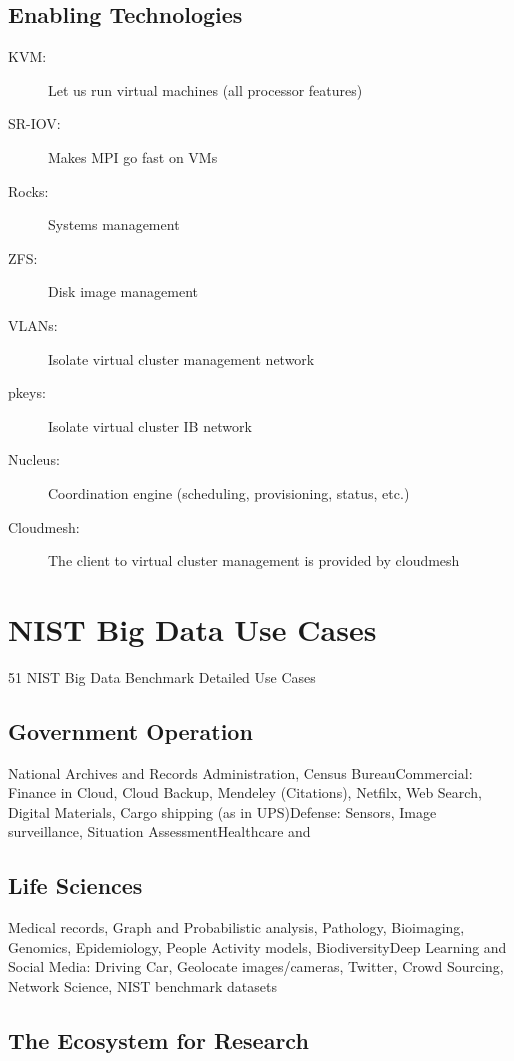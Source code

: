 \subsection{Enabling Technologies}
\begin{description}
\item[KVM:] Let us run virtual machines (all processor features)
\item[SR-IOV:] Makes MPI go fast on VMs
\item[Rocks:] Systems management
\item[ZFS:] Disk image management
\item[VLANs:] Isolate virtual cluster management network
\item[pkeys:] Isolate virtual cluster IB network
\item[Nucleus:] Coordination engine (scheduling, provisioning, status,
  etc.)
\item[Cloudmesh:] The client to virtual cluster management is
  provided by cloudmesh 
\end{description}


\section{NIST Big Data Use Cases}

51 NIST Big Data Benchmark Detailed Use Cases

\subsection{Government Operation} 

National Archives and Records Administration, Census BureauCommercial:
Finance in Cloud, Cloud Backup, Mendeley (Citations), Netfilx, Web
Search, Digital Materials, Cargo shipping (as in UPS)Defense: Sensors,
Image surveillance, Situation AssessmentHealthcare and

\subsection{Life Sciences} 

Medical records, Graph and Probabilistic analysis, Pathology,
Bioimaging, Genomics, Epidemiology, People Activity models,
BiodiversityDeep Learning and Social Media: Driving Car, Geolocate
images/cameras, Twitter, Crowd Sourcing, Network Science, NIST
benchmark datasets

\subsection{The Ecosystem for Research} 

